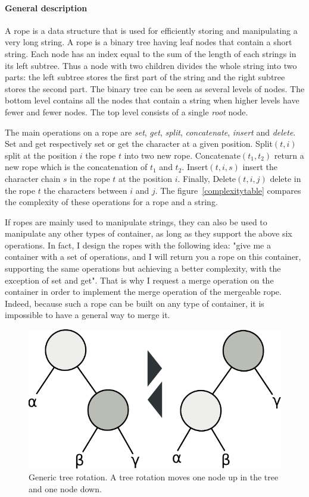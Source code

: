 \documentclass{article}
\renewcommand{\-}{\hyp}
\begin{document}
\paragraph{General description}
A rope is a data structure that is used for efficiently storing and manipulating a very long string.
A rope is a binary tree having leaf nodes that contain a short string.
Each node has an index equal to the sum of the length of each strings in its left subtree.
Thus a node with two children divides the whole string into two parts: the left subtree stores the first part of the string and the right subtree stores the second part.
The binary tree can be seen as several levels of nodes.
The bottom level contains all the nodes that contain a string when higher levels have fewer and fewer nodes.
The top level consists of a single \emph{root} node.

The main operations on a rope are \emph{set}, \emph{get}, \emph{split}, \emph{concatenate}, \emph{insert} and \emph{delete}. Set and get respectively set or get the character at a given position. Split$(t, i)$ split at the position $i$ the rope $t$ into two new rope. Concatenate$(t_1, t_2)$ return a new rope which is the concatenation of $t_1$ and $t_2$. Insert$(t, i, s)$ insert the character chain $s$ in the rope $t$ at the position $i$. Finally, Delete$(t, i, j)$ delete in the rope $t$ the characters between $i$ and $j$. The figure~\ref{complexitytable} compares the complexity of these operations for a rope and a string.

If ropes are mainly used to manipulate strings, they can also be used to manipulate any other types of container, as long as they support the above six operations.
In fact, I design the ropes with the following idea:
"give me a container with a set of operations, and I will return you a rope on this container, supporting the same operations but achieving a better complexity, with the exception of set and get".
That is why I request a merge operation on the container in order to implement the merge operation of the mergeable rope.
Indeed, because such a rope can be built on any type of container, it is impossible to have a general way to merge it.

\begin{figure}[hbt]
\centering
\includegraphics[scale=0.6]{rotations.pdf}
\caption{Generic tree rotation. A tree rotation moves one node up in the tree and one node down.}
\label{rotationgraph}
\end{figure}
\end{document}
